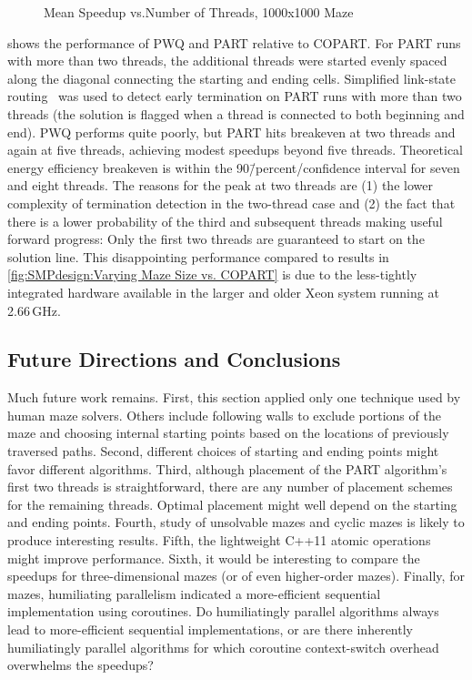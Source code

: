 \begin{figure}
\centering
{}
\caption{Mean Speedup vs.\@ Number of Threads, 1000x1000 Maze}
\label{fig:SMPdesign:Mean Speedup vs. Number of Threads; 1000x1000 Maze}
\end{figure}

shows the performance of PWQ and PART relative to COPART\@.
For PART runs with more than two threads, the additional threads were
started evenly spaced along the diagonal connecting the starting and
ending cells.
Simplified link-state routing~\cite{BERT-87} was used to
detect early termination on PART runs with more than two threads
(the solution is flagged when
a thread is connected to both beginning and end).
PWQ performs quite poorly, but
PART hits breakeven at two threads and again at five threads, achieving
modest speedups beyond five threads.
Theoretical energy efficiency breakeven is within the 90\=/percent\-/confidence
interval for seven and eight threads.
The reasons for the peak at two threads are (1) the lower complexity
of termination detection in the two-thread case and (2) the fact that
there is a lower probability of the third and subsequent threads making
useful forward progress:
Only the first two threads are guaranteed to start on the solution line.
This disappointing performance compared to results in
\cref{fig:SMPdesign:Varying Maze Size vs. COPART}
is due to the less-tightly integrated hardware available in the
larger and older Xeon system running at 2.66\,GHz.

\subsection{Future Directions and Conclusions}
\label{sec:SMPdesign:Future Directions and Conclusions}

Much future work remains.
First, this section applied only one technique used by human maze solvers.
Others include following walls to exclude portions of the maze
and choosing internal starting points based on the
locations of previously traversed paths.
Second, different choices of
starting and ending points might favor different algorithms.
Third, although placement of the PART algorithm's
first two threads is straightforward, there are any number of
placement schemes for the remaining threads.
Optimal placement might well depend on the starting and ending points.
Fourth, study of unsolvable mazes and cyclic mazes
is likely to produce interesting results.
Fifth, the lightweight C++11 atomic operations might improve performance.
Sixth, it would be interesting to compare the speedups for
three-dimensional mazes (or of even higher-order mazes).
Finally, for mazes, humiliating parallelism indicated a
more-efficient sequential implementation using coroutines.
Do humiliatingly parallel algorithms always lead to more-efficient
sequential implementations, or are there inherently humiliatingly parallel
algorithms for which coroutine context-switch overhead overwhelms the
speedups?

